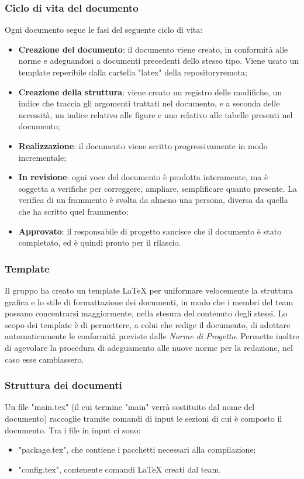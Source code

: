 	\subsubsection{Ciclo di vita del documento}
	Ogni documento segue le fasi del seguente ciclo di vita:
	\begin{itemize}
		\item \textbf{Creazione del documento}: il documento viene creato, in conformità alle norme e adeguandosi a documenti precedenti dello stesso tipo.
		Viene usato un template reperibile dalla cartella "latex" della repository\glosp remota;
		\item \textbf{Creazione della struttura}: viene creato un registro delle modifiche, un indice che traccia gli argomenti trattati nel documento, e a seconda delle necessità, un indice relativo alle figure e uno relativo alle tabelle presenti nel documento;
		\item \textbf{Realizzazione}: il documento viene scritto progressivamente in modo incrementale;
		\item \textbf{In revisione}: ogni voce del documento è prodotta interamente, ma è soggetta a verifiche per correggere, ampliare, semplificare quanto presente. La verifica di un frammento è svolta da almeno una persona, diversa da quella che ha scritto quel frammento;
		\item \textbf{Approvato}: il responsabile di progetto sancisce che il documento è stato completato, ed è quindi pronto per il rilascio.
	\end{itemize}

	\subsubsection{Template}
	Il gruppo ha creato un template \LaTeX{} per uniformare velocemente la 
	struttura grafica e lo stile di formattazione dei documenti, in modo che i 
	membri del team possano concentrarsi maggiormente, nella stesura del 
	contenuto degli stessi. Lo scopo dei template è di permettere, a colui che 
	redige il documento, di adottare automaticamente le conformità previste 
	dalle \textit{Norme di Progetto}. Permette inoltre di agevolare la 
	procedura di adeguamento alle nuove norme per la redazione, nel caso esse 
	cambiassero.
	\subsubsection{Struttura dei documenti}
	Un file "main.tex" (il cui termine "main" verrà sostituito dal nome del documento) raccoglie tramite comandi di input le sezioni di cui è composto il documento. Tra i file in input ci sono:
	\begin{itemize}
		\item "package.tex", che contiene i pacchetti necessari alla compilazione;
		\item "config.tex", contenente comandi \LaTeX{} creati dal team.
	\end{itemize}
